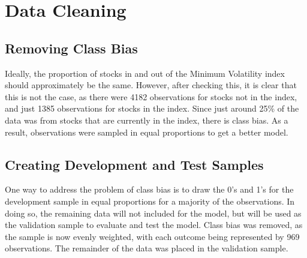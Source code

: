 \documentclass[12pt,twoside]{reedthesis}
\theoremstyle{definition}
\theoremstyle{definition}
\theoremstyle{definition}
\theoremstyle{remark}
\begin{document}
\section{Data Cleaning}\label{data-cleaning-1}

\subsection{Removing Class Bias}\label{removing-class-bias}

Ideally, the proportion of stocks in and out of the Minimum Volatility
index should approximately be the same. However, after checking this, it
is clear that this is not the case, as there were 4182 observations for
stocks not in the index, and just 1385 observations for stocks in the
index. Since just around 25\% of the data was from stocks that are
currently in the index, there is class bias. As a result, observations
were sampled in equal proportions to get a better model.

\subsection{Creating Development and Test
Samples}\label{creating-development-and-test-samples}

One way to address the problem of class bias is to draw the 0's and 1's
for the development sample in equal proportions for a majority of the
observations. In doing so, the remaining data will not included for the
model, but will be used as the validation sample to evaluate and test
the model. Class bias was removed, as the sample is now evenly weighted,
with each outcome being represented by 969 observations. The remainder
of the data was placed in the validation sample.
\end{document}

